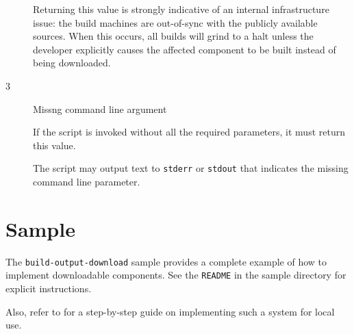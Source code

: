 \begin{description}
  Returning this value is strongly indicative of an internal
  infrastructure issue: the build machines are out-of-sync with the
  publicly available sources.  When this occurs, all builds will grind
  to a halt unless the developer explicitly causes the affected
  component to be built instead of being downloaded.

\item[3]{Missng command line argument}

  If the script is invoked without all the required parameters, it
  must return this value.

  The script may output text to \texttt{stderr} or \texttt{stdout}
  that indicates the missing command line parameter.

\end{description}

\section{Sample}

The \texttt{build-output-download} sample provides a complete example
of how to implement downloadable components.  See the \texttt{README}
in the sample directory for explicit instructions.

Also, refer to  for a step-by-step
guide on implementing such a system for local use.








